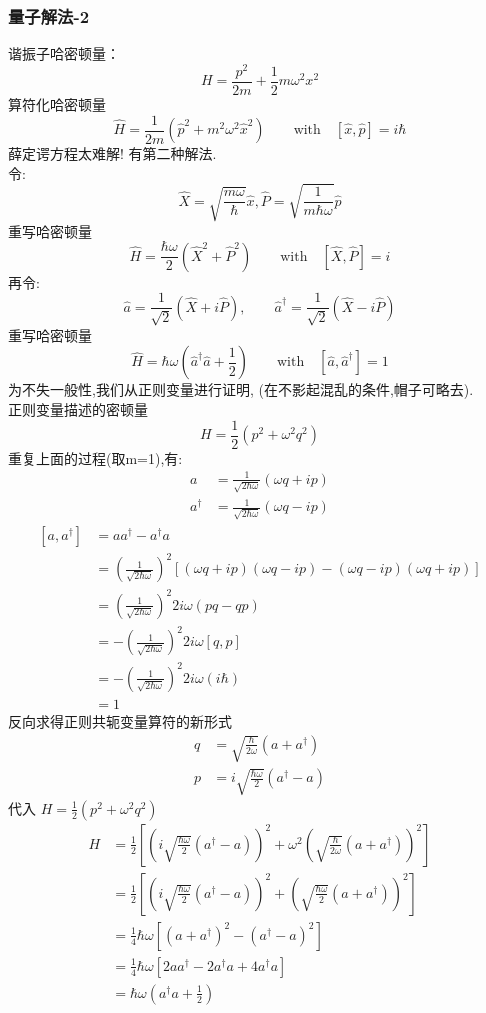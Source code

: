 \subsubsection{量子解法-2}
谐振子哈密顿量：
\[ H= \frac{p^2}{2m} +\frac{1}{2} m\omega ^2 x^2 \]
算符化哈密顿量
\[  \hat{H}= \frac{1}{2m} ({\hat{p}^2}+ m^2\omega ^2 \hat{x}^2 ) \qquad \text{with} \quad [\hat{x},\hat{p}]=i\hbar\]
薛定谔方程太难解! 有第二种解法. \\ 
令: 
\[ \hat{X} = \sqrt{\frac{m\omega}{\hbar}}\hat{x}, \hat{P} = \sqrt{\frac{1}{m \hbar \omega}} \hat{p} \]
重写哈密顿量
\[  \hat{H}= \frac{\hbar \omega }{2} (\hat{X}^2 + \hat{P}^2 ) \qquad \text{with} \quad [\hat{X},\hat{P}]=i \]
再令:
\[ \hat{a}= \frac{1 }{\sqrt{2}} (\hat{X} + i\hat{P} ), \qquad \hat{a}^\dagger= \frac{1 }{\sqrt{2}} (\hat{X} - i\hat{P} ) \]
重写哈密顿量
\[  \hat{H}= \hbar \omega \left(\hat{a}^\dagger \hat{a} + \frac{1 }{2}\right) \qquad \text{with} \quad [\hat{a},\hat{a}^\dagger]=1 \]
{\证} 为不失一般性,我们从正则变量进行证明, (在不影起混乱的条件,帽子可略去). \\
正则变量描述的密顿量
\[H= \frac{1}{2}(p ^2 + \omega ^2 q ^2) \]
重复上面的过程(取m=1),有:
\[\begin{aligned}
    a &= \frac{1}{\sqrt{2\hbar \omega}} (\omega q+i p)  \\ 
    a ^\dagger &= \frac{1}{\sqrt{2\hbar \omega}} (\omega q - i p)
\end{aligned}\]
    \[\begin{aligned}
        [a,a ^\dagger] &= a a ^\dagger- a ^\dagger a \\ 
        &= (\frac{1}{\sqrt{2\hbar \omega}})^2 [(\omega q+i p)(\omega q - i p)-(\omega q-i p)(\omega q + i p)] \\ 
        &= (\frac{1}{\sqrt{2\hbar \omega}})^2  2i\omega( p q - q  p) \\ 
        &= - (\frac{1}{\sqrt{2\hbar \omega}})^2  2i\omega[ q,  p]  \\
        &= - (\frac{1}{\sqrt{2\hbar \omega}})^2  2i\omega (i\hbar)  \\
        &= 1
    \end{aligned}\]
反向求得正则共轭变量算符的新形式
    \[ \begin{aligned}
      q &= \sqrt{\frac{\hbar}{2 \omega}} (a + a ^\dagger ) \\ 
      p &= i\sqrt{\frac{\hbar\omega}{2 }} (a^\dagger -a)  
    \end{aligned} 
    \] 
代入 $H= \frac{1}{2}(p ^2 + \omega ^2 q ^2 )$ \\ 
    \[ \begin{aligned}
        H& = \frac{1}{2} [ (i\sqrt{\frac{\hbar\omega}{2 }} (a^\dagger -a) )^2 + \omega ^2  (\sqrt{\frac{\hbar}{2 \omega}} (a + a ^\dagger ))^2] \\
        & = \frac{1}{2} [ (i\sqrt{\frac{\hbar\omega}{2 }} (a^\dagger -a) )^2 +  (\sqrt{\frac{\hbar\omega}{2 }} (a + a ^\dagger ))^2] \\
        & = \frac{1}{4}\hbar \omega [(a + a ^\dagger )^2-( a ^\dagger - a)^2 ] \\
        & = \frac{1}{4}\hbar \omega [2a a ^\dagger -  2a^\dagger a  + 4a ^\dagger a  ] \\
        &=  \hbar \omega (a ^\dagger a + \frac{1}{2})
      \end{aligned} 
      \] 
